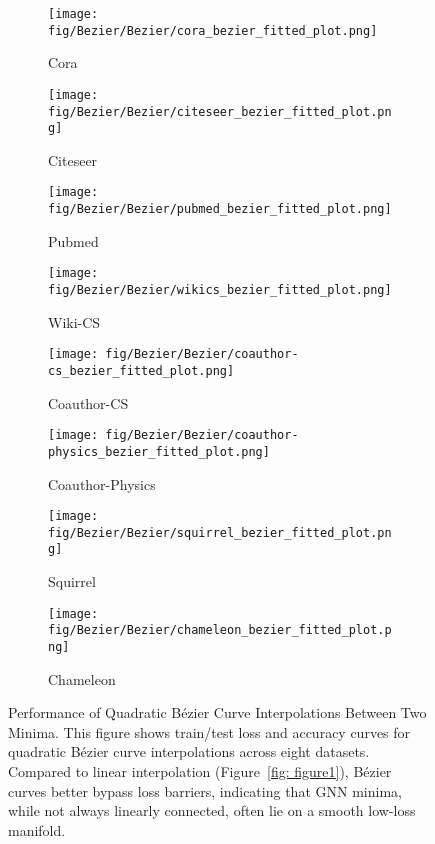 \begin{figure*}[!ht]\label{fig:Bezier}
    \centering
    \begin{subfigure}[b]{0.24\textwidth}
        \centering
        \texttt{[image: fig/Bezier/Bezier/cora\_bezier\_fitted\_plot.png]}
        \caption{Cora}
    \end{subfigure}
    \begin{subfigure}[b]{0.24\textwidth}
        \centering
        \texttt{[image: fig/Bezier/Bezier/citeseer\_bezier\_fitted\_plot.png]}
        \caption{Citeseer}
    \end{subfigure}
    \begin{subfigure}[b]{0.24\textwidth}
        \centering
        \texttt{[image: fig/Bezier/Bezier/pubmed\_bezier\_fitted\_plot.png]}
        \caption{Pubmed}
    \end{subfigure}
    \begin{subfigure}[b]{0.24\textwidth}
        \centering
        \texttt{[image: fig/Bezier/Bezier/wikics\_bezier\_fitted\_plot.png]}
        \caption{Wiki-CS}
    \end{subfigure}
    \vspace{5pt}
    \newline
    \begin{subfigure}[b]{0.24\textwidth}
        \centering
        \texttt{[image: fig/Bezier/Bezier/coauthor-cs\_bezier\_fitted\_plot.png]}
        \caption{Coauthor-CS}
    \end{subfigure}
    \begin{subfigure}[b]{0.24\textwidth}
        \centering
        \texttt{[image: fig/Bezier/Bezier/coauthor-physics\_bezier\_fitted\_plot.png]}
        \caption{Coauthor-Physics}
    \end{subfigure}
    \begin{subfigure}[b]{0.24\textwidth}
        \centering
        \texttt{[image: fig/Bezier/Bezier/squirrel\_bezier\_fitted\_plot.png]}
        \caption{Squirrel}
    \end{subfigure}
    \begin{subfigure}[b]{0.24\textwidth}
        \centering
        \texttt{[image: fig/Bezier/Bezier/chameleon\_bezier\_fitted\_plot.png]}
        \caption{Chameleon}
    \end{subfigure}
    \caption{Performance of Quadratic Bézier Curve Interpolations Between Two Minima. This figure shows train/test loss and accuracy curves for quadratic Bézier curve interpolations across eight datasets. Compared to linear interpolation (Figure~\ref{fig: figure1}), Bézier curves better bypass loss barriers, indicating that GNN minima, while not always linearly connected, often lie on a smooth low-loss manifold.}
    \label{fig: figure2}
\vspace{-0.2in}
\end{figure*}

